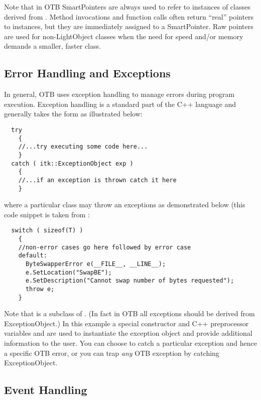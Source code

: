 Note that in OTB SmartPointers are always used to refer to instances of
classes derived from . Method invocations and function
calls often return ``real'' pointers to instances, but they are immediately
assigned to a SmartPointer. Raw pointers are used for non-LightObject classes when
the need for speed and/or memory demands a smaller, faster class.


\subsection{Error Handling and Exceptions}
\label{sec:ErrorHandling}


In general, OTB uses exception handling to manage errors during program
execution. Exception handling is a standard part of the C++ language and
generally takes the form as illustrated below:
\small
\begin{verbatim}
  try
    {
    //...try executing some code here...
    }
  catch ( itk::ExceptionObject exp )
    {
    //...if an exception is thrown catch it here
    }
\end{verbatim}
\normalsize

where a particular class may throw an exceptions as demonstrated below (this
code snippet is taken from :
\small
\begin{verbatim}
  switch ( sizeof(T) )
    {
    //non-error cases go here followed by error case  
    default:  
      ByteSwapperError e(__FILE__, __LINE__);
      e.SetLocation("SwapBE");
      e.SetDescription("Cannot swap number of bytes requested");
      throw e;
    }
\end{verbatim}
\normalsize

Note that  is a subclass of
. (In fact in OTB all exceptions should be derived
from ExceptionObject.) In this example a special constructor and C++
preprocessor variables  and  are used to instantiate
the exception object and provide additional information to the user. You can
choose to catch a particular exception and hence a specific OTB error, or you
can trap \emph{any} OTB exception by catching ExceptionObject.


\subsection{Event Handling}
\label{sec:EventHandling}

